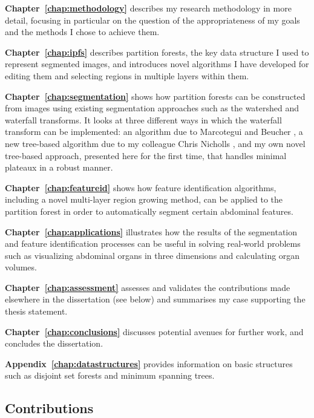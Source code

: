 \textbf{Chapter~\ref{chap:methodology}} describes my research methodology in more detail, focusing in particular on the question of the appropriateness of my goals and the methods I chose to achieve them.

\textbf{Chapter~\ref{chap:ipfs}} describes partition forests, the key data structure I used to represent segmented images, and introduces novel algorithms I have developed for editing them and selecting regions in multiple layers within them.

\textbf{Chapter~\ref{chap:segmentation}} shows how partition forests can be constructed from images using existing segmentation approaches such as the watershed and waterfall transforms. It looks at three different ways in which the waterfall transform can be implemented: an algorithm due to Marcotegui and Beucher \cite{marcotegui05}, a new tree-based algorithm due to my colleague Chris Nicholls \cite{nicholls09}, and my own novel tree-based approach, presented here for the first time, that handles minimal plateaux in a robust manner.

\textbf{Chapter~\ref{chap:featureid}} shows how feature identification algorithms, including a novel multi-layer region growing method, can be applied to the partition forest in order to automatically segment certain abdominal features.

\textbf{Chapter~\ref{chap:applications}} illustrates how the results of the segmentation and feature identification processes can be useful in solving real-world problems such as visualizing abdominal organs in three dimensions and calculating organ volumes.

\textbf{Chapter~\ref{chap:assessment}} assesses and validates the contributions made elsewhere in the dissertation (see below) and summarises my case supporting the thesis statement.

\textbf{Chapter~\ref{chap:conclusions}} discusses potential avenues for further work, and concludes the dissertation.

\textbf{Appendix~\ref{chap:datastructures}} provides information on basic structures such as disjoint set forests and minimum spanning trees.

\subsection{Contributions}


